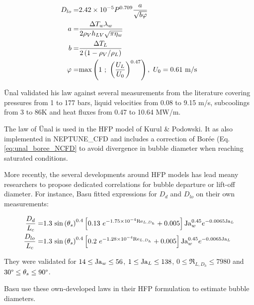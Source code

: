 \begin{align}
D_{lo}=& 2.42\times 10^{-5} P^{0.709}\frac{a}{\sqrt{b\varphi}}
\label{eq:dlo_unal}
\\
\nonumber a =& \frac{\Delta T_{w}\lambda_{w}}{2\rho_{V}h_{LV}\sqrt{\pi \eta_{w}} }\\
\nonumber b =& \frac{\Delta T_{L}}{2\left( 1-\rho_{V}/\rho_{L} \right)}\\
\nonumber \varphi=& \mathrm{max}\left( 1\ ;\ \left( \frac{U_{L}}{U_{0}} \right)^{0.47} \right),\ U_{0}=0.61~\mathrm{m/s}
\end{align}

\"Unal validated his law against several measurements from the literature covering pressures from 1 to 177 bars, liquid velocities from 0.08 to 9.15 m/s, subcoolings from 3 to 86K and heat fluxes from 0.47 to 10.64 MW/m.


\begin{remark*}{}
The law of \"Unal is used in the HFP model of Kurul \& Podowski. It as also implemented in NEPTUNE\_CFD and includes a correction of Borée \etal (Eq. \ref{eq:unal_boree_NCFD} to avoid divergence in bubble diameter when reaching saturated conditions.
\end{remark*}

\npar

More recently, the several developments around HFP models has lead meany researchers to propose dedicated correlations for bubble departure or lift-off diameter. For instance, Basu \etal fitted expressions for $D_{d}$ and $D_{lo}$ on their own measurements:

\begin{align}
\frac{D_{d}}{L_{c}} =& 1.3~\sin{\theta_{s}}^{0.4}\crocht{ 0.13\ e^{-1.75\times 10^{-4} \Re_{L,D_{h}}}+0.005 }\Ja_{w}^{0.45}e^{-0.0065\Ja_{L}}
\label{eq:dd_basu}\\
%
\frac{D_{lo}}{L_{c}} =& 1.3~ \sin{\theta_{s}}^{0.4}\crocht{ 0.2\ e^{-1.28\times 10^{-4} \Re_{L,D_{h}}}+0.005 }\Ja_{w}^{0.45}e^{-0.0065\Ja_{L}}
\label{eq:dlo_basu}
\end{align}

They were validated for $14 \leq \mathrm{Ja}_{w} \leq 56$, $1 \leq \mathrm{Ja}_{L} \leq 138$, $0\leq \Re_{L,D_{h}} \leq 7980$ and $30\degree \leq \theta_{s} \leq 90 \degree$.


\begin{remark*}{}
Basu \etal use these own-developed laws in their HFP formulation to estimate bubble diameters.
\end{remark*}

\npar

